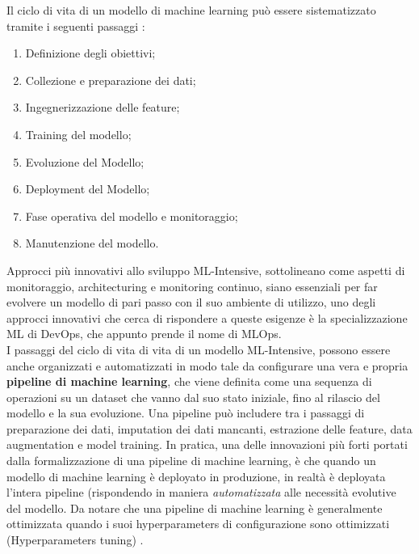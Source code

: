 Il ciclo di vita di un modello di machine learning può essere sistematizzato tramite i seguenti passaggi \cite{burkov2020machine}:

\begin{enumerate}
    \item Definizione degli obiettivi;
    \item Collezione e preparazione dei dati;
    \item Ingegnerizzazione delle feature;
    \item Training del modello;
    \item Evoluzione del Modello;
    \item Deployment del Modello;
    \item Fase operativa del modello e monitoraggio;
    \item Manutenzione del modello.
\end{enumerate}

Approcci più innovativi allo sviluppo ML-Intensive, sottolineano come aspetti di monitoraggio, architecturing e monitoring continuo, siano essenziali per far evolvere un modello di pari passo con il suo ambiente di utilizzo, uno degli approcci innovativi che cerca di rispondere a queste esigenze è la specializzazione ML di DevOps, che appunto prende il nome di MLOps.\\

I passaggi del ciclo di vita di vita di un modello ML-Intensive, possono essere anche organizzati e automatizzati in modo tale da configurare una vera e propria \textbf{pipeline di machine learning}, che viene definita come una sequenza di operazioni su un dataset che vanno dal suo stato iniziale, fino al rilascio del modello e la sua evoluzione. Una pipeline può includere tra i passaggi di preparazione dei dati, imputation dei dati mancanti, estrazione delle feature, data augmentation e model training\cite{burkov2020machine}. In pratica, una delle innovazioni più forti portati dalla formalizzazione di una pipeline di machine learning, è che quando un modello di machine learning è deployato in produzione, in realtà è deployata l'intera pipeline\cite{burkov2020machine} (rispondendo in maniera \emph{automatizzata} alle necessità evolutive del modello. Da notare che una pipeline di machine learning è generalmente ottimizzata quando i suoi hyperparameters di configurazione sono ottimizzati (Hyperparameters tuning) \cite{burkov2020machine}.

